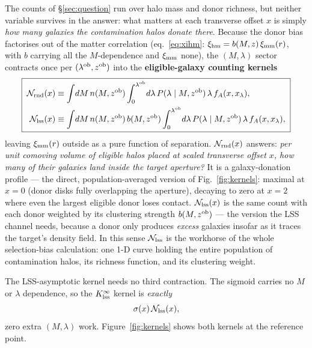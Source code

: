 \documentclass[a4paper, 11pt]{article}
\newcommand{\lob}{\lambda^{\rm ob}}
\newcommand{\zob}{z^{\rm ob}}
\newcommand{\ximm}{\xi_{\rm mm}}
\newcommand{\xihm}{\xi_{\rm hm}}
\newcommand{\Ncal}{\mathcal{N}}
\newcommand{\KlssInf}{K_{\rm lss}^{\infty}}
\begin{document}
The counts of \S\ref{sec:question} run over halo mass and donor
richness, but neither variable survives in the answer: what
matters at each transverse offset $x$ is simply \emph{how many
galaxies the contamination halos donate there}. Because the
donor bias factorises out of the matter correlation
(eq.~\ref{eq:xihm}: $\xihm = b(M,z)\,\ximm(r)$, with $b$ carrying
all the $M$-dependence and $\ximm$ none), the $(M,\lambda)$
sector contracts once per $(\lob,\zob)$ into the
\textbf{eligible-galaxy counting kernels}
\begin{equation}
\boxed{\;
\begin{aligned}
\Ncal_{\rm rnd}(x) &\equiv \int\!dM\, n(M,\zob)
\int_0^{\lob}\!d\lambda\, P(\lambda\mid M,\zob)\,\lambda\,
f_A(x,x_\lambda),
\\
\Ncal_{\rm lss}(x) &\equiv \int\!dM\, n(M,\zob)\,b(M,\zob)
\int_0^{\lob}\!d\lambda\, P(\lambda\mid M,\zob)\,\lambda\,
f_A(x,x_\lambda),
\end{aligned}
\;}
\label{eq:N_def}
\end{equation}
leaving $\ximm(r)$ outside as a pure function of separation.
$\Ncal_{\rm rnd}(x)$ answers: \emph{per unit comoving volume of eligible
halos placed at scaled transverse offset $x$, how many of their
galaxies land inside the target aperture?} It is a
galaxy-donation profile --- the direct, population-averaged
version of Fig.~\ref{fig:kernels}: maximal at $x=0$ (donor disks
fully overlapping the aperture), decaying to zero at $x=2$ where
even the largest eligible donor loses contact. $\Ncal_{\rm lss}(x)$ is
the same count with each donor weighted by its clustering
strength $b(M,\zob)$ --- the version the LSS channel needs,
because a donor only produces \emph{excess} galaxies insofar as
it traces the target's density field. In this sense $\Ncal_{\rm lss}$ is
the workhorse of the whole selection-bias calculation: one 1-D
curve holding the entire population of contamination halos, its
richness function, and its clustering weight.

The LSS-asymptotic kernel needs no third contraction. The sigmoid
carries no $M$ or $\lambda$ dependence, so the $\KlssInf$ kernel
is \emph{exactly}
\begin{equation}
\sigma(x)\,\Ncal_{\rm lss}(x),
\end{equation}
zero extra $(M,\lambda)$ work. Figure~\ref{fig:kernels} shows
both kernels at the reference point.
\end{document}
